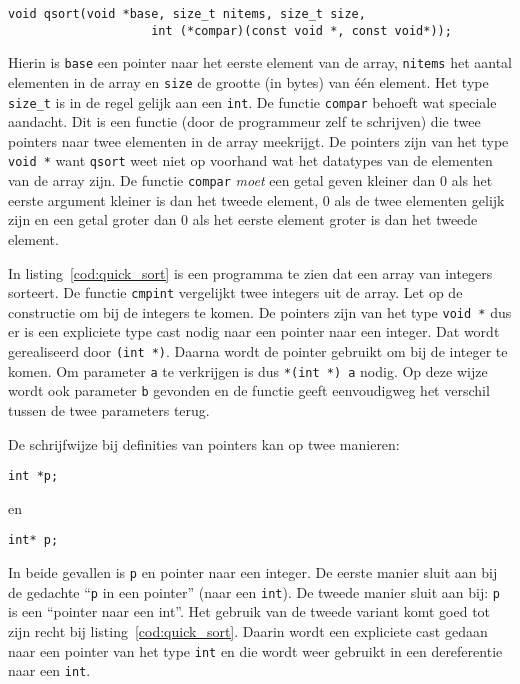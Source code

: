 \begin{lstlisting}[style=lstoneline]
void qsort(void *base, size_t nitems, size_t size,
                    int (*compar)(const void *, const void*));
\end{lstlisting}

Hierin is \texttt{base} een pointer naar het eerste element van de array, \texttt{nitems} het aantal elementen in de array en \texttt{size} de grootte (in bytes) van één element. Het type \texttt{size\_t} is in de regel gelijk aan een \texttt{int}. De functie \texttt{compar} behoeft wat speciale aandacht. Dit is een functie (door de programmeur zelf te schrijven) die twee pointers naar twee elementen in de array meekrijgt. De pointers zijn van het type \texttt{void~*} want \texttt{qsort} weet niet op voorhand wat het datatypes van de elementen van de array zijn. De functie \texttt{compar} \textsl{moet} een getal geven kleiner dan 0 als het eerste argument kleiner is dan het tweede element, 0 als de twee elementen gelijk zijn en een getal groter dan 0 als het eerste element groter is dan het tweede element.

In listing~\ref{cod:quick_sort} is een programma te zien dat een array van integers sorteert. De functie \texttt{cmpint} vergelijkt twee integers uit de array. Let op de constructie om bij de integers te komen. De pointers zijn van het type \texttt{void~*} dus er is een expliciete type cast nodig naar een pointer naar een integer. Dat wordt gerealiseerd door \texttt{(int~*)}. Daarna wordt de pointer gebruikt om bij de integer te komen. Om parameter \texttt{a} te verkrijgen is dus \texttt{*(int~*)~a} nodig. Op deze wijze wordt ook parameter \texttt{b} gevonden en de functie geeft eenvoudigweg het verschil tussen de twee parameters terug.



\begin{infobox}
De schrijfwijze bij definities van pointers kan op twee manieren:

\hspace*{1em}\texttt{int *p;}

en

\hspace*{1em}\texttt{int* p;}

In beide gevallen is \texttt{p} en pointer naar een integer. De eerste manier sluit aan bij de gedachte ``\texttt{p} in een pointer'' (naar een \texttt{int}). De tweede manier sluit aan bij: \texttt{p} is een ``pointer naar een int''. Het gebruik van de tweede variant komt goed tot zijn recht bij listing~\ref{cod:quick_sort}. Daarin wordt een expliciete cast gedaan naar een pointer van het type \texttt{int} en die wordt weer gebruikt in een dereferentie naar een \texttt{int}.
\end{infobox}

